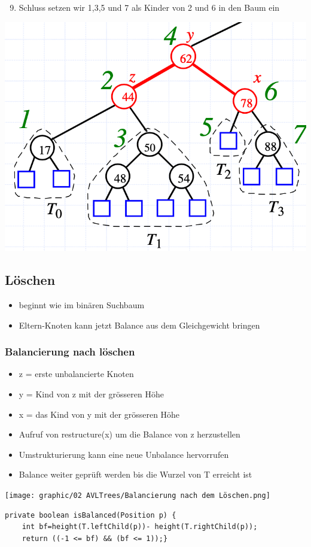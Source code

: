 \begin{enumerate}
    \setcounter{enumi}{8}
    \item Schluss setzen wir 1,3,5 und 7 als Kinder von 2 und 6 in den Baum ein
\end{enumerate}
\vspace{-8pt}
\begin{center}
    \includegraphics[scale=.2]{graphic/02 AVLTrees/Cut-Link7.png}
\end{center}
\vspace{-8pt}


\subsection{Löschen}
\begin{itemize}
    \item beginnt wie im binären Suchbaum
    \item Eltern-Knoten kann jetzt Balance aus dem Gleichgewicht bringen
\end{itemize}
\subsubsection{Balancierung nach löschen}
\begin{itemize}
    \item z = erste unbalancierte Knoten
    \item y = Kind von z mit der grösseren Höhe
    \item x = das Kind von y mit der grösseren Höhe
    \item Aufruf von restructure(x) um die Balance von z herzustellen
    \item Umstrukturierung kann eine neue Unbalance hervorrufen
    \item Balance weiter geprüft werden bis die Wurzel von T erreicht ist
\end{itemize}
\begin{center}
    \texttt{[image: graphic/02 AVLTrees/Balancierung nach dem Löschen.png]}
\end{center}
\begin{lstlisting}
private boolean isBalanced(Position p) {
    int bf=height(T.leftChild(p))- height(T.rightChild(p));
    return ((-1 <= bf) && (bf <= 1));}
\end{lstlisting}


\newpage
